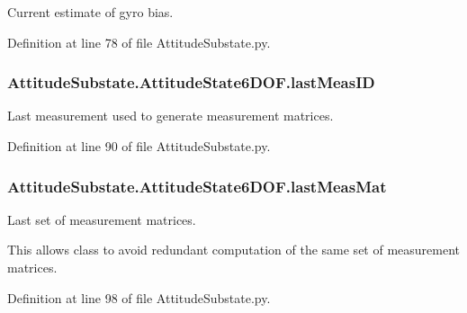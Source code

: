 Current estimate of gyro bias. 



Definition at line 78 of file Attitude\+Substate.\+py.

\subsubsection[{\texorpdfstring{last\+Meas\+ID}{lastMeasID}}]{\setlength{\rightskip}{0pt plus 5cm}Attitude\+Substate.\+Attitude\+State6\+D\+O\+F.\+last\+Meas\+ID}\hypertarget{classAttitudeSubstate_1_1AttitudeState6DOF_a1ea482e5536162f74876d1dd23b12e96}{}\label{classAttitudeSubstate_1_1AttitudeState6DOF_a1ea482e5536162f74876d1dd23b12e96}


Last measurement used to generate measurement matrices. 



Definition at line 90 of file Attitude\+Substate.\+py.

\subsubsection[{\texorpdfstring{last\+Meas\+Mat}{lastMeasMat}}]{\setlength{\rightskip}{0pt plus 5cm}Attitude\+Substate.\+Attitude\+State6\+D\+O\+F.\+last\+Meas\+Mat}\hypertarget{classAttitudeSubstate_1_1AttitudeState6DOF_ae23a47fae330703aa8a50b207275c9b0}{}\label{classAttitudeSubstate_1_1AttitudeState6DOF_ae23a47fae330703aa8a50b207275c9b0}


Last set of measurement matrices. 

This allows class to avoid redundant computation of the same set of measurement matrices. 

Definition at line 98 of file Attitude\+Substate.\+py.

